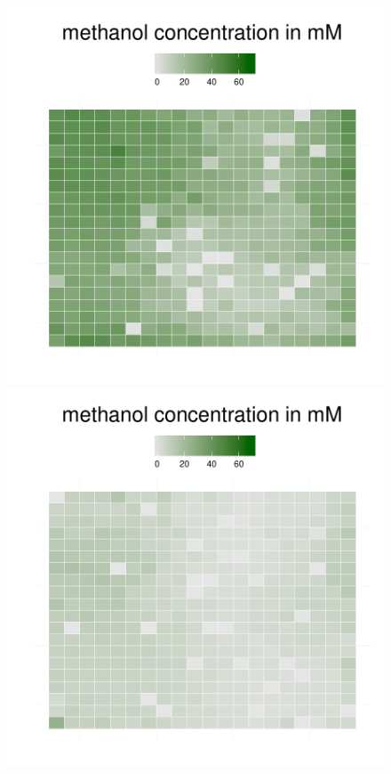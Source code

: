 \begin{figure}[h!]
{\begin{minipage}[t]{0.3\textwidth}
  \end{minipage}
  \begin{minipage}[t]{0.3\textwidth}
    \includegraphics[width=\textwidth]{../results/img/barkeri_20x20_seed9659_meth75.pdf}
  \end{minipage}
  \begin{minipage}[t]{0.3\textwidth}
    \includegraphics[width=\textwidth]{../results/img/barkeri_20x20_seed9659_meth100.pdf}

\end{minipage}}
\end{figure}
